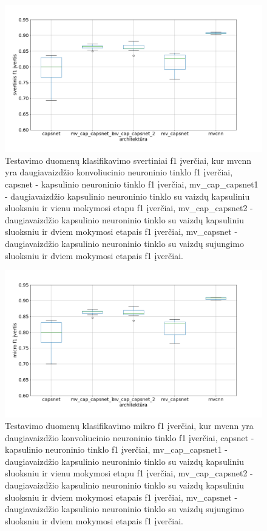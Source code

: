 \begin{figure}[H]
	\centering
	\includegraphics[scale=0.4]{img/boxplot_f1_weighted.png}
	\caption{
		Testavimo duomenų klasifikavimo svertiniai f1 įverčiai, kur mvcnn yra daugiavaizdžio konvoliucinio neuroninio tinklo f1 įverčiai, capsnet - kapsulinio neuroninio tinklo f1 įverčiai, mv\_cap\_capsnet1 - daugiavaizdžio kapsulinio neuroninio tinklo su vaizdų kapsuliniu sluoksniu ir vienu mokymosi etapu f1 įverčiai, mv\_cap\_capsnet2 - daugiavaizdžio kapsulinio neuroninio tinklo su vaizdų kapsuliniu sluoksniu ir dviem mokymosi etapais f1 įverčiai,
		mv\_capsnet - daugiavaizdžio kapsulinio neuroninio tinklo su vaizdų sujungimo sluoksniu ir dviem mokymosi etapais f1 įverčiai.
	}
	\label{img:box_weighted_f1}
\end{figure}

\begin{figure}[H]
	\centering
	\includegraphics[scale=0.4]{img/boxplot_f1_micro.png}
	\caption{
		Testavimo duomenų klasifikavimo mikro f1 įverčiai, kur mvcnn yra daugiavaizdžio konvoliucinio neuroninio tinklo f1 įverčiai, capsnet - kapsulinio neuroninio tinklo f1 įverčiai, mv\_cap\_capsnet1 - daugiavaizdžio kapsulinio neuroninio tinklo su vaizdų kapsuliniu sluoksniu ir vienu mokymosi etapu f1 įverčiai, mv\_cap\_capsnet2 - daugiavaizdžio kapsulinio neuroninio tinklo su vaizdų kapsuliniu sluoksniu ir dviem mokymosi etapais f1 įverčiai,
		mv\_capsnet - daugiavaizdžio kapsulinio neuroninio tinklo su vaizdų sujungimo sluoksniu ir dviem mokymosi etapais f1 įverčiai.
	}
	\label{img:box_micro_f1}
\end{figure}

